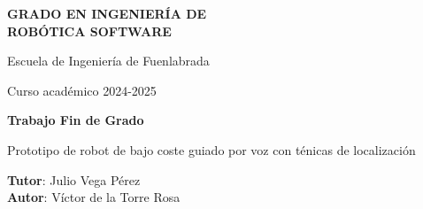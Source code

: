 \thispagestyle{empty}
\vspace{2cm}

\begin{figure}[htb]
  \centerline{}
\end{figure}

\begin{center}
  {\Large {\bf GRADO EN INGENIERÍA DE\\ 
                ROBÓTICA SOFTWARE}}
  \vspace{5mm}
 
  {\large {Escuela de Ingeniería de Fuenlabrada}}
  \vspace{5mm}

  {\large {Curso académico 2024-2025}}

  \vspace{1cm}

  {\large {\bf Trabajo Fin de Grado}}

  \vspace{2cm}

  {\Large {Prototipo de robot de bajo coste guiado por voz con ténicas de localización\\[1cm] }}

  \vspace{4cm}
  {\bf Tutor}: Julio Vega Pérez \\
  {\bf Autor}: Víctor de la Torre Rosa
\end{center}

\clearpage
\thispagestyle{empty}
